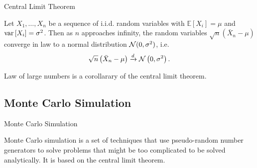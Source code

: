     \begin{frame}{Central Limit Theorem}
        \begin{theorem}
            Let $X_1, \dots, X_n$ be a sequence of i.i.d. random variables with $\mathbb{E}[X_i] = \mu$ and $\operatorname*{var}\left[X_i\right] = \sigma^2$. 
            Then as $n$ approaches infinity, the random variables $\sqrt{n}(\bar{X}_n - \mu)$ converge in law to a normal distribution ${\cal N}(0, \sigma^2)$, i.e.
            \begin{equation}
                \sqrt{n}\left(\bar{X}_n - \mu\right) \xrightarrow{d} {\cal N}\left(0,\sigma^2\right).
            \end{equation}
        \end{theorem}
        \begin{nb}
            Law of large numbers is a corollarary of the central limit theorem.
        \end{nb}
    \end{frame}

\subsection{Monte Carlo Simulation}
    \begin{frame}{Monte Carlo Simulation}
        \begin{definition}
            Monte Carlo simulation is a set of techniques that use pseudo-random number generators to solve problems that might be too complicated to be solved analytically. It is based on the central limit theorem.
        \end{definition}
    \end{frame}